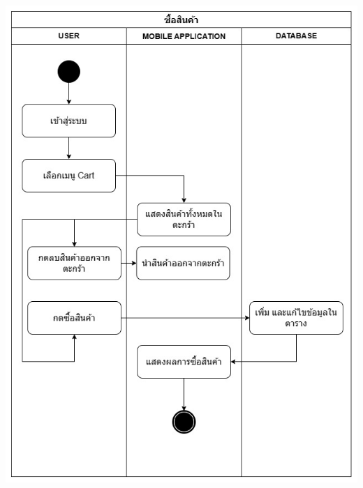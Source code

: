 \begin{center}
    \includegraphics[scale=0.25]{pic/diagram/ad-mobile5.jpg}\\
    \vspace{2cm}

\end{center}
